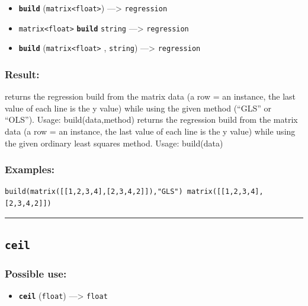 \documentclass[]{book}
\providecommand{\tightlist}{%
  \setlength{\itemsep}{0pt}\setlength{\parskip}{0pt}}
\theoremstyle{definition}
\theoremstyle{definition}
\theoremstyle{definition}
\theoremstyle{remark}
\begin{document}
\begin{itemize}
\tightlist
\item
  \textbf{\texttt{build}}
  (\texttt{matrix\textless{}float\textgreater{}}) ---\textgreater{}
  \texttt{regression}
\item
  \texttt{matrix\textless{}float\textgreater{}} \textbf{\texttt{build}}
  \texttt{string} ---\textgreater{} \texttt{regression}
\item
  \textbf{\texttt{build}} (\texttt{matrix\textless{}float\textgreater{}}
  , \texttt{string}) ---\textgreater{} \texttt{regression}
\end{itemize}

\subsubsection{Result:}\label{result-78}

returns the regression build from the matrix data (a row = an instance,
the last value of each line is the y value) while using the given method
(``GLS'' or ``OLS''). Usage: build(data,method) returns the regression
build from the matrix data (a row = an instance, the last value of each
line is the y value) while using the given ordinary least squares
method. Usage: build(data)

\subsubsection{Examples:}\label{examples-61}

\begin{verbatim}
build(matrix([[1,2,3,4],[2,3,4,2]]),"GLS") matrix([[1,2,3,4],[2,3,4,2]]) 
\end{verbatim}

\begin{center}\rule{0.5\linewidth}{\linethickness}\end{center}

\subsection{\texorpdfstring{\texttt{ceil}}{ceil}}\label{ceil}

\subsubsection{Possible use:}\label{possible-use-80}

\begin{itemize}
\tightlist
\item
  \textbf{\texttt{ceil}} (\texttt{float}) ---\textgreater{}
  \texttt{float}
\end{itemize}
\end{document}
